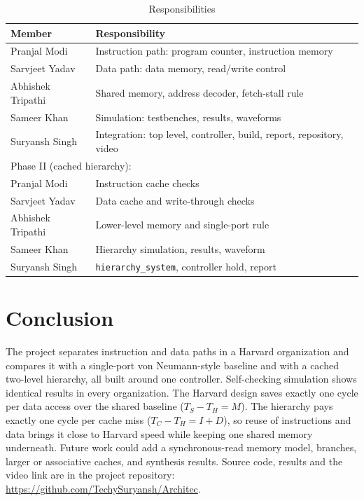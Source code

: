 \documentclass[conference,a4paper]{IEEEtran}
\begin{document}
\begin{table}[t]
\caption{Responsibilities}
\label{tab:contrib}
\centering
\begin{tabular}{p{}p{}}
\hline
Member & Responsibility \\ \hline
Pranjal Modi & Instruction path: program counter, instruction memory \\
Sarvjeet Yadav & Data path: data memory, read/write control \\
Abhishek Tripathi & Shared memory, address decoder, fetch-stall rule \\
Sameer Khan & Simulation: testbenches, results, waveforms \\
Suryansh Singh & Integration: top level, controller, build, report, repository, video \\ \hline
\multicolumn{2}{l}{Phase II (cached hierarchy):} \\
Pranjal Modi & Instruction cache checks \\
Sarvjeet Yadav & Data cache and write-through checks \\
Abhishek Tripathi & Lower-level memory and single-port rule \\
Sameer Khan & Hierarchy simulation, results, waveform \\
Suryansh Singh & \texttt{hierarchy\_system}, controller hold, report \\ \hline
\end{tabular}
\end{table}

\section{Conclusion}
The project separates instruction and data paths in a Harvard organization
and compares it with a single-port von Neumann-style baseline and with a
cached two-level hierarchy, all built around one controller. Self-checking
simulation shows identical results in every organization. The Harvard
design saves exactly one cycle per data access over the shared baseline
($T_S-T_H=M$). The hierarchy pays exactly one cycle per cache miss
($T_C-T_H=I+D$), so reuse of instructions and data brings it close to Harvard
speed while keeping one shared memory underneath. Future work could add a
synchronous-read memory model, branches, larger or associative caches, and
synthesis results. Source code, results and the video link are in the project
repository: \url{https://github.com/TechySuryansh/Architec}.
\end{document}
